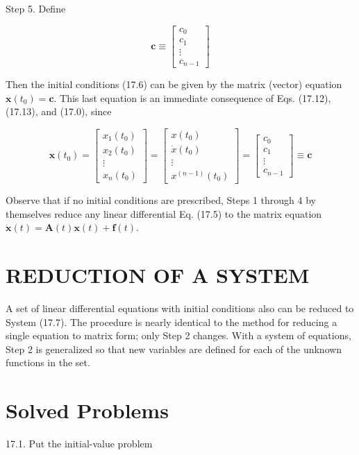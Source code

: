 \documentclass[10pt]{article}
\begin{document}
Step 5. Define

$$
\mathbf{c} \equiv\left[\begin{array}{c}
c_{0} \\
c_{1} \\
\vdots \\
c_{n-1}
\end{array}\right]
$$

Then the initial conditions (17.6) can be given by the matrix (vector) equation $\mathbf{x}\left(t_{0}\right)=\mathbf{c}$. This last equation is an immediate consequence of Eqs. (17.12), (17.13), and (17.0), since

$$
\mathbf{x}\left(t_{0}\right)=\left[\begin{array}{c}
x_{1}\left(t_{0}\right) \\
x_{2}\left(t_{0}\right) \\
\vdots \\
x_{n}\left(t_{0}\right)
\end{array}\right]=\left[\begin{array}{c}
x\left(t_{0}\right) \\
\dot{x}\left(t_{0}\right) \\
\vdots \\
x^{(n-1)}\left(t_{0}\right)
\end{array}\right]=\left[\begin{array}{c}
c_{0} \\
c_{1} \\
\vdots \\
c_{n-1}
\end{array}\right] \equiv \mathbf{c}
$$

Observe that if no initial conditions are prescribed, Steps 1 through 4 by themselves reduce any linear differential Eq. (17.5) to the matrix equation $\dot{\mathbf{x}}(t)=\mathbf{A}(t) \mathbf{x}(t)+\mathbf{f}(t)$.

\section*{REDUCTION OF A SYSTEM}
A set of linear differential equations with initial conditions also can be reduced to System (17.7). The procedure is nearly identical to the method for reducing a single equation to matrix form; only Step 2 changes. With a system of equations, Step 2 is generalized so that new variables are defined for each of the unknown functions in the set.

\section*{Solved Problems}
17.1. Put the initial-value problem
\end{document}
